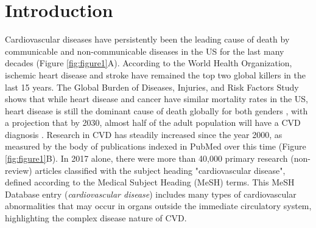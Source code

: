 \documentclass[letter]{bioinfo}
\begin{document}
\maketitle
	
\section*{Introduction}
	
Cardiovascular diseases have persistently been the leading cause of death by communicable and non-communicable diseases in the US for the last many decades (Figure \ref{fig:figure1}A).  According to the World Health Organization, ischemic heart disease and stroke have remained the top two global killers in the last 15 years. The Global Burden of Diseases, Injuries, and Risk Factors Study shows that while heart disease and cancer have similar mortality rates in the US, heart disease is still the dominant cause of death globally for both genders \citep{Roth:2018:Global}, with a projection that by 2030, almost half of the adult population will have a CVD diagnosis \citep{Leopold:2018:Emerging,Heidenreich:2011:Forecasting}.  Research in CVD has steadily increased since the year 2000, as measured by the body of publications indexed in PubMed over this time (Figure \ref{fig:figure1}B).  In 2017 alone, there were more than 40,000 primary research (non-review) articles classified with the subject heading "cardiovascular disease", defined according to the Medical Subject Heading (MeSH) terms.  This MeSH Database entry (\textit{cardiovascular disease}) includes many types of cardiovascular abnormalities that may occur in organs outside the immediate circulatory system, highlighting the complex disease nature of CVD.
\end{document}

